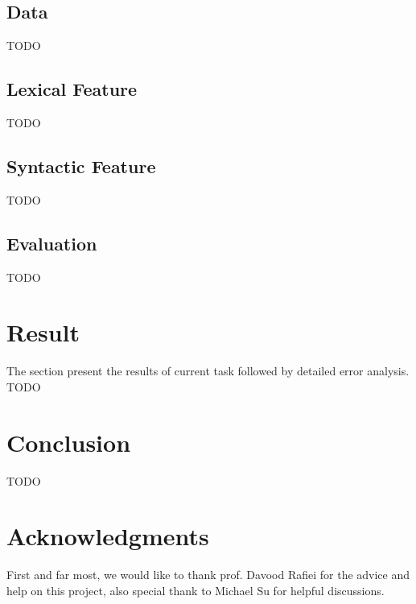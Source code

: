 \documentclass[11pt,a4paper]{article}
\begin{document}
\subsection{Data}
TODO

\subsection{Lexical Feature}
TODO

\subsection{Syntactic Feature}
TODO


\subsection{Evaluation}
TODO

\section{Result}
The section present the results of current task followed by detailed error analysis. 
TODO

\section{Conclusion}
TODO

\section*{Acknowledgments}

First and far most, we would like to thank prof. Davood Rafiei for the advice and help on this project, also special thank to Michael Su for helpful discussions.


\end{document}
